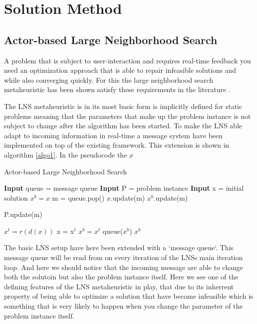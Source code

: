 \documentclass[preprint,12pt,authoryear]{elsarticle}
\begin{document}
\section{Solution Method}
\label{sec:2-solution-method}

\subsection{Actor-based Large Neighborhood Search}
A problem that is subject to user-interaction and requires real-time feedback you need an optimization approach that is able to repair infeasible solutions and while also 
converging quickly. For this the large neighborhood search metaheuristic has been shown satisfy these requirements in the literature \cite{gendreau_handbook_2019}. 

The LNS metaheuristic is in its most basic form is implicitly defined for static problems meaning that the parameters that make up the problem instance is not subject to change 
after the algorithm has been started. To make the LNS able adapt to incoming information in real-time a message system have been implemented on top of the existing framework. This 
extension is shown in algorithm \ref{algo1}. In the pseudocode the $x$ 

\begin{algorithm}[H]
\caption{Actor-based Large Neighborhood Search}  \label{algo1}
\begin{algorithmic}[1]
\State \textbf{Input} queue = message queue
\State \textbf{Input} P     = problem instance
\State \textbf{Input} x     = initial solution
\State $x^b = x$
        \State m = queue.pop()
        \State $x$.update(m)
        \State $x^b$.update(m)
		
		\State P.update(m)
    \EndWhile
	
    \State $x^t = r(d(x))$
                           \label{alg:acceptance_criteria_start}
        \State x = x$^t$
    \EndIf                                       \label{alg:acceptance_criteria_end}
                       \label{alg:objective_start}
        \State $x^b = x^t$
		\State queue($x^b$)
    \EndIf                                       \label{alg:objective_end}
\EndWhile
\Return $x^b$
\end{algorithmic}
\end{algorithm}

The basic LNS setup have here been extended with a `message queue`. This message queue will be read from on every iteration of the LNSs main iteration loop. And here we should notice that the 
incoming message are able to change both the solutoin but also the problem instance itself. Here we see one of the defining features of the LNS metaheuristic in play, that due to its inherrent 
property of being able to optimize a solution that have become infeasible which is something that is very likely to happen when you change the parameter of the problem instance itself. 
\end{document}
